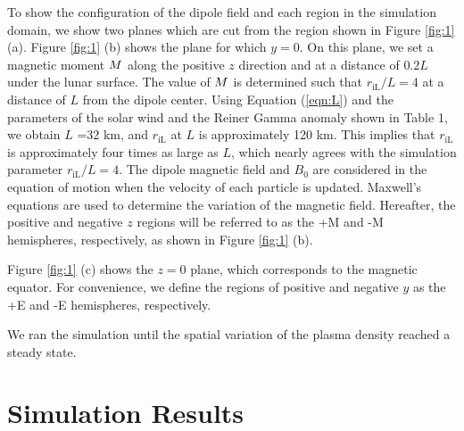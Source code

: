\documentclass[draft,jgrga]{agutex2015}
\begin{document}
\begin{article}
To show the configuration of the dipole field and each region 
in the simulation domain, 
we show two planes which are cut from the region shown in Figure \ref{fig:1} (a).
Figure \ref{fig:1} (b) shows the plane for which $y=0$.
On this plane, we set 
a magnetic moment 
$\mbox{\boldmath $M$}$ 
along the positive $z$ direction and
at a distance of $0.2L$ under the lunar surface.
The value of 
$\mbox{\boldmath $M$}$ 
is determined such that $r_\mathrm{iL}/L =4$ at a distance of $L$ from the dipole center.
Using Equation (\ref{eqn:L}) and the parameters of the solar wind and the
Reiner Gamma anomaly shown in Table 1,
we obtain $L$ =32 km, and $r_\mathrm{iL}$ at $L$ is approximately 120 km. 
This implies that 
$r_\mathrm{iL}$ is approximately four times as large as $L$,
which nearly agrees with the simulation parameter $r_\mathrm{iL}/L =4$.
The dipole magnetic field and $B_\mathrm{0}$
are considered in the equation of motion 
when the velocity of each particle is updated. 
Maxwell's equations are used to determine the variation of the magnetic field.
Hereafter, the positive and negative $z$ regions will be referred to as the
+M and -M hemispheres, respectively, as shown in Figure \ref{fig:1} (b).

Figure \ref{fig:1} (c) shows the $z=0$ plane,
which corresponds to the magnetic equator.
For convenience, 
we define the regions of positive and negative $y$ as the +E and -E hemispheres, respectively.

We ran the simulation until the spatial variation of the plasma density reached a steady state. 
%



\section{Simulation Results}


\end{article}
\end{document}
